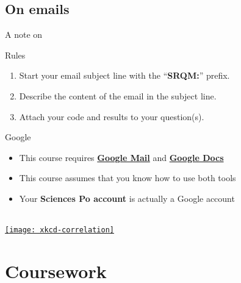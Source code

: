 \documentclass[t]{beamer}
\begin{document}
  \subsection{On emails}
  
  \begin{frame}[t]{A note on }

    \begin{alertblock}{Rules}
      \begin{enumerate}
        \item Start your email subject line with the ``\textbf{SRQM:}'' prefix.
        \item Describe the content of the email in the subject line.
        \item Attach your code and results to your question(s).
      \end{enumerate}
    \end{alertblock}
    
    \begin{block}{Google}
			\begin{itemize}
				\item This course requires \textbf{\href{http://mail.google.com/}{Google Mail}} %
					and \textbf{\href{http://docs.google.com/}{Google Docs}}
				\item This course assumes that you know how to use both tools
				\item Your \textbf{Sciences Po account} is actually a Google account
			\end{itemize}
    \end{block}

  \end{frame}

  \begin{frame}[t, plain]
    
    \vspace{.1\paperwidth}

    \begin{center}
      {%
      \Large {}}\\[.1\paperwidth]
      
      \href{http://xkcd.com/552/}{\texttt{[image: xkcd-correlation]}%
      }
    \end{center}

  \end{frame}

  \section{Coursework}
	
\end{document}
